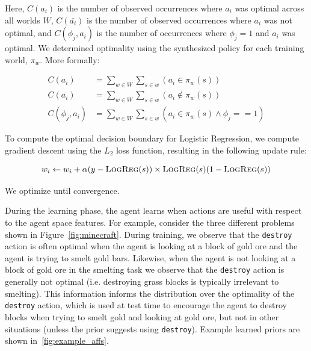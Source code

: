 \documentclass[11pt]{article}
\begin{document}
Here, $C(a_i)$ is the number of observed occurrences where $a_i$ was optimal across all worlds $W$,
$C(\bar{a_i})$ is the number of observed occurrences where $a_i$ was not optimal,
and $C(\phi_j, a_i)$ is the number of occurrences where $\phi_j=1$ and $a_i$ was optimal.
We determined optimality using the synthesized policy for each training world, $\pi_w$. More formally:

\begin{align}
C(a_i) &= \sum_{w \in W} \sum_{s \in w} (a_i \in \pi_w(s)) \\
C(\bar{a_i}) &= \sum_{w \in W} \sum_{s \in w} (a_i \not \in \pi_w(s) ) \\
C(\phi_j, a_i) &= \sum_{w \in W} \sum_{s \in w} (a_i  \in \pi_w(s) \wedge \phi_j == 1)
\end{align}

To compute the optimal decision boundary for Logistic Regression, we compute gradient descent using the $L_2$ loss function, resulting in the following update rule:

\begin{equation}
w_i \leftarrow w_i + \alpha(y - \textsc{LogReg}(s)) \times \textsc{LogReg}(s)(1 - \textsc{LogReg}(s))
\end{equation}

We optimize until convergence.

During the learning phase, the agent learns when actions are useful
with respect to the agent space features.  For example, consider the three different
problems shown in Figure~\ref{fig:minecraft}.  During training, we observe
that the \texttt{destroy} action is often optimal when the agent is
looking at a block of gold ore and the agent is trying to smelt gold
bars.  Likewise, when the agent is not looking at a block of gold
ore in the smelting task we observe that the \texttt{destroy} action
is generally not optimal (i.e. destroying grass blocks is typically
irrelevant to smelting).  This information informs the distribution
over the optimality of the \texttt{destroy} action, which is used at
test time to encourage the agent to destroy blocks when trying to
smelt gold and looking at gold ore, but not in other situations
(unless the prior suggests using \texttt{destroy}). Example
learned priors are shown in~\ref{fig:example_affs}.
\end{document}
